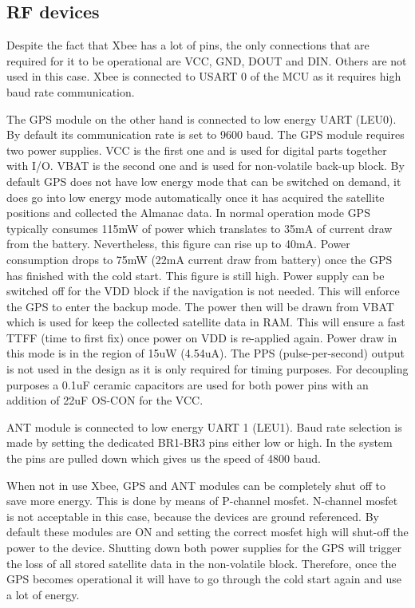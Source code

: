 \subsection{RF devices}
Despite the fact that Xbee has a lot of pins, the only connections that are required for it to be operational are VCC, GND, DOUT and DIN. Others are not used in this case. Xbee is connected to USART 0 of the MCU as it requires high baud rate communication.

The GPS module on the other hand is connected to low energy UART (LEU0). By default its communication rate is set to 9600 baud. The GPS module requires two power supplies. VCC is the first one and is used for digital parts together with I/O. VBAT is the second one and is used for non-volatile back-up block. By default GPS does not have low energy mode that can be switched on demand, it does go into low energy mode automatically once it has acquired the satellite positions and collected the Almanac data. In normal operation mode GPS typically consumes 115mW of power which translates to 35mA of current draw from the battery. Nevertheless, this figure can rise up to 40mA. Power consumption drops to 75mW (22mA current draw from battery) once the GPS has finished with the cold start. This figure is still high. Power supply can be switched off for the VDD block if the navigation is not needed. This will enforce the GPS to enter the backup mode. The power then will be drawn from VBAT which is used for keep the collected satellite data in RAM. This will ensure a fast TTFF (time to first fix) once power on VDD is re-applied again. Power draw in this mode is in the region of 15uW (4.54uA).
The PPS (pulse-per-second) output is not used in the design as it is only required for timing purposes. For decoupling purposes a 0.1uF ceramic capacitors are used for both power pins with an addition of 22uF OS-CON for the VCC.

ANT module is connected to low energy UART 1 (LEU1). Baud rate selection is made by setting the dedicated BR1-BR3 pins either low or high. In the system the pins are pulled down which gives us the speed of 4800 baud. 

When not in use Xbee, GPS and ANT modules can be completely shut off to save more energy. This is done by means of P-channel mosfet. N-channel mosfet is not acceptable in this case, because the devices are ground referenced. By default these modules are ON and setting the correct mosfet high will shut-off the power to the device. Shutting down both power supplies for the GPS will trigger the loss of all stored satellite data in the non-volatile block. Therefore, once the GPS becomes operational it will have to go through the cold start again and use a lot of energy.

